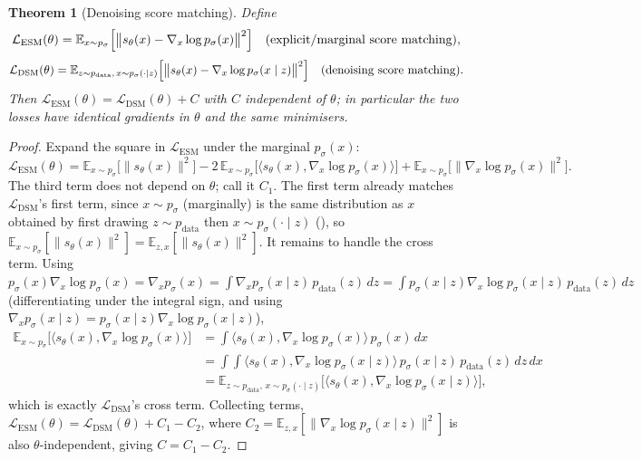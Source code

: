 \documentclass[11pt,a4paper]{report}
\newtheorem{theorem}{Theorem}[chapter]
\theoremstyle{definition}
\theoremstyle{remark}
\newcommand{\EE}{\mathbb E}
\begin{document}
\begin{theorem}[Denoising score matching]
\label{thm:dsm-equivalence}
Define
\[
\mathcal L_{\mathrm{ESM}}(\theta) = \EE_{x\sim p_\sigma}\Bigl[\bigl\|s_\theta(x)-\nabla_x\log p_\sigma(x)\bigr\|^2\Bigr]
\quad\text{(explicit/marginal score matching)},
\]
\begin{equation}
\label{eq:dsm}
\mathcal L_{\mathrm{DSM}}(\theta) = \EE_{z\sim p_{\mathrm{data}},\,x\sim p_\sigma(\cdot\mid z)}\Bigl[\bigl\|s_\theta(x)-\nabla_x\log p_\sigma(x\mid z)\bigr\|^2\Bigr]
\quad\text{(denoising score matching)} .
\end{equation}
Then $\mathcal L_{\mathrm{ESM}}(\theta) = \mathcal L_{\mathrm{DSM}}(\theta) + C$
with $C$ independent of $\theta$; in particular the two losses have
identical gradients in $\theta$ and the same minimisers.
\end{theorem}

\begin{proof}
Expand the square in $\mathcal L_{\mathrm{ESM}}$ under the marginal $p_\sigma(x)$:
\[
\mathcal L_{\mathrm{ESM}}(\theta)
=
\EE_{x\sim p_\sigma}\bigl[\|s_\theta(x)\|^2\bigr]
- 2\,\EE_{x\sim p_\sigma}\bigl[\langle s_\theta(x),\nabla_x\log p_\sigma(x)\rangle\bigr]
+ \EE_{x\sim p_\sigma}\bigl[\|\nabla_x\log p_\sigma(x)\|^2\bigr] .
\]
The third term does not depend on $\theta$; call it $C_1$. The first term
already matches $\mathcal L_{\mathrm{DSM}}$'s first term, since
$x\sim p_\sigma$ (marginally) is the same distribution as $x$ obtained by
first drawing $z\sim p_{\mathrm{data}}$ then $x\sim p_\sigma(\cdot\mid z)$
(), so
$\EE_{x\sim p_\sigma}[\|s_\theta(x)\|^2] = \EE_{z,x}[\|s_\theta(x)\|^2]$.
It remains to handle the cross term. Using
$p_\sigma(x)\nabla_x\log p_\sigma(x) = \nabla_x p_\sigma(x) = \int \nabla_x p_\sigma(x\mid z)\,p_{\mathrm{data}}(z)\,dz
= \int p_\sigma(x\mid z)\nabla_x\log p_\sigma(x\mid z)\,p_{\mathrm{data}}(z)\,dz$
(differentiating under the integral sign, and using
$\nabla_x p_\sigma(x\mid z)=p_\sigma(x\mid z)\nabla_x\log p_\sigma(x\mid z)$),
\begin{align*}
\EE_{x\sim p_\sigma}\bigl[\langle s_\theta(x),\nabla_x\log p_\sigma(x)\rangle\bigr]
&=
\int \langle s_\theta(x),\nabla_x\log p_\sigma(x)\rangle\,p_\sigma(x)\,dx\\
&=
\int\!\!\int \langle s_\theta(x),\nabla_x\log p_\sigma(x\mid z)\rangle\,p_\sigma(x\mid z)\,p_{\mathrm{data}}(z)\,dz\,dx\\
&=
\EE_{z\sim p_{\mathrm{data}},\,x\sim p_\sigma(\cdot\mid z)}\bigl[\langle s_\theta(x),\nabla_x\log p_\sigma(x\mid z)\rangle\bigr],
\end{align*}
which is exactly $\mathcal L_{\mathrm{DSM}}$'s cross term. Collecting terms,
$\mathcal L_{\mathrm{ESM}}(\theta) = \mathcal L_{\mathrm{DSM}}(\theta) + C_1 - C_2$,
where $C_2=\EE_{z,x}[\|\nabla_x\log p_\sigma(x\mid z)\|^2]$ is also
$\theta$-independent, giving $C=C_1-C_2$.
\end{proof}
\end{document}
